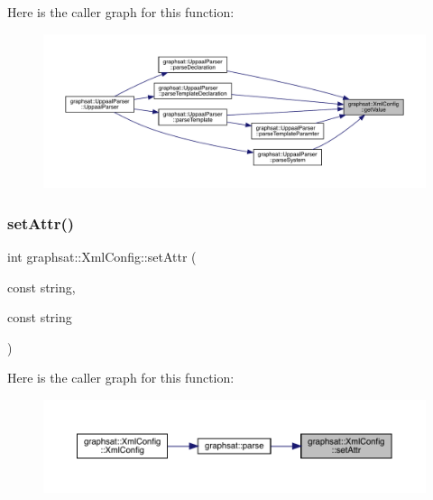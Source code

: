 Here is the caller graph for this function\+:
\nopagebreak
\begin{figure}[H]
\begin{center}
\leavevmode
\includegraphics[width=350pt]{classgraphsat_1_1_xml_config_ae8f15789e71f2bb0f795b832b107698f_icgraph}
\end{center}
\end{figure}
\mbox{\label{classgraphsat_1_1_xml_config_a1405c11dfe812f779d97523937c83f2d}} 
\subsubsection{\texorpdfstring{setAttr()}{setAttr()}}
{\footnotesize\ttfamily int graphsat\+::\+Xml\+Config\+::set\+Attr (\begin{DoxyParamCaption}\item[{const}]{string,  }\item[{const}]{string }\end{DoxyParamCaption})}

Here is the caller graph for this function\+:
\nopagebreak
\begin{figure}[H]
\begin{center}
\leavevmode
\includegraphics[width=350pt]{classgraphsat_1_1_xml_config_a1405c11dfe812f779d97523937c83f2d_icgraph}
\end{center}
\end{figure}
\mbox{\label{classgraphsat_1_1_xml_config_af2247871edf1a0b47fd32574e0c0396f}} 
